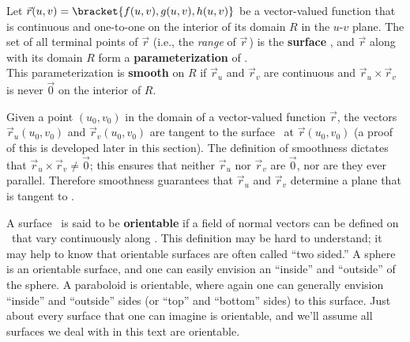 
\begin{definition}\label{def:parameterized_surface}
Let $\vec r(u,v) = \bracket{f(u,v),g(u,v),h(u,v)}$ be a vector-valued function that is continuous and one-to-one on the interior of its domain $R$ in the $u$-$v$ plane. The set of all terminal points of $\vec r$ (i.e., the \emph{range} of $\vec r$\,) is the \textbf{surface} \surfaceS, and $\vec r$ along with its domain $R$ form a \textbf{parameterization} of \surfaceS.\bigskip\\
This parameterization is \textbf{smooth} on $R$ if $\vec r_u$ and $\vec r_v$ are continuous and $\vec r_u\times \vec r_v$ is never $\vec 0$ on the interior of $R$.
\end{definition}

Given a point $(u_0,v_0)$ in the domain of a vector-valued function $\vec r$, the vectors $\vec r_u(u_0,v_0)$ and $\vec r_v(u_0,v_0)$ are tangent to the surface \surfaceS\ at $\vec r(u_0,v_0)$ (a proof of this is developed later in this section). The definition of smoothness dictates that $\vec r_u\times \vec r_v \neq \vec 0$; this ensures that neither $\vec r_u$ nor $\vec r_v$ are $\vec 0$, nor are they ever parallel. Therefore smoothness guarantees that $\vec r_u$ and $\vec r_v$ determine a plane that is tangent to \surfaceS.


A surface \surfaceS\ is said to be \textbf{orientable} if a field of normal vectors can be defined on \surfaceS\ that vary continuously along \surfaceS. This definition may be hard to understand; it may help to know that orientable surfaces are often called ``two sided.'' A sphere is an orientable surface, and one can easily envision an ``inside'' and ``outside'' of the sphere. A paraboloid is orientable, where again one can generally envision  ``inside'' and ``outside'' sides (or ``top'' and ``bottom'' sides) to this surface. Just about every surface that one can imagine is orientable, and we'll assume all surfaces we deal with in this text are orientable.

